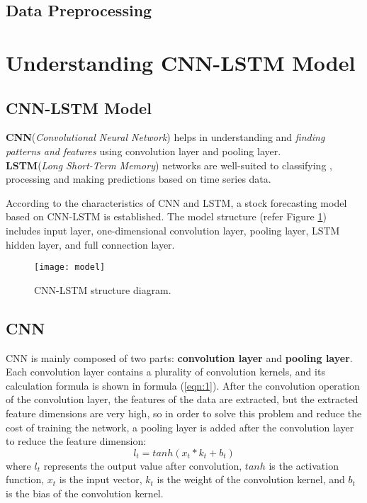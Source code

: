 \documentclass[12pt]{article}
\begin{document}
\subsection{Data Preprocessing}

\clearpage
\section{Understanding CNN-LSTM Model}
\subsection{CNN-LSTM Model}
\textbf{CNN}(\textit{Convolutional Neural Network}) helps in understanding and \textit{finding patterns and features} using convolution layer and pooling layer.\\
\textbf{LSTM}(\textit{Long Short-Term Memory}) networks are well-suited to classifying , processing and making predictions based on time series data.\par
According to the characteristics of CNN and LSTM, a stock forecasting model based on CNN-LSTM is established. The model structure (refer Figure \ref{fig:model}) includes input layer, one-dimensional convolution layer, pooling layer, LSTM hidden layer, and full connection layer.

\begin{figure}[h]

\centering



\texttt{[image: model]}
\caption{CNN-LSTM structure diagram.}
\label{fig:model}
\end{figure}

\subsection{CNN}
CNN is mainly composed of two parts: \textbf{convolution layer} and \textbf{pooling layer}. Each convolution layer contains a plurality of convolution kernels, and its calculation formula is shown in formula (\ref{eqn:1}). After the convolution operation of the convolution layer, the features of the data are extracted, but the extracted feature dimensions are very high, so in order to solve this problem and reduce the cost of training the network, a pooling layer is added after the convolution layer to reduce the feature dimension:
\begin{equation}
\label{eqn:1} 
l_t=tanh(x_t * k_t+b_t)
\end{equation}
where $l_t$ represents the output value after convolution, $tanh$ is the activation function,  $x_t$ is the input vector, $k_t$ is the weight of the convolution kernel, and $b_t$ is the bias of the convolution kernel.
\end{document}
